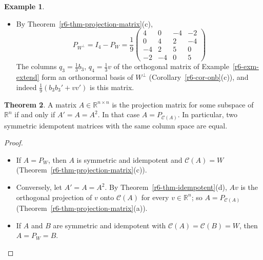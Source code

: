 \documentclass[12pt]{article}
\newcommand{\R}{\mathbb R}
\DeclareMathOperator{\tr}{tr}
\theoremstyle{definition}
\newtheorem{theorem}{Theorem}
\newtheorem{example}[theorem]{Example}
\begin{document}
\begin{example}
\begin{itemize}
\[\]
the same matrix, as Theorem~\ref{r6-thm-projection-matrix}(a),(b) asserts. Also
\(\tr P_W=\frac19(5+5+4+4)=2=\dim W\), and \(P_Wy=(0,5,-2,4)'=\hat w\) for \(y\) of
Example~\ref{r6-exm-projection-onb}.
\item By Theorem~\ref{r6-thm-projection-matrix}(c),
\[
P_{W^\perp}=I_4-P_W=\frac19\begin{pmatrix}4&0&-4&-2\\0&4&2&-4\\-4&2&5&0\\-2&-4&0&5\end{pmatrix}
\]
The columns \(q_3=\frac13b_3\), \(q_4=\frac13v\) of the orthogonal matrix of Example~\ref{r6-exm-extend} form an
orthonormal basis of \(W^\perp\) (Corollary~\ref{r6-cor-onb}(c)), and indeed
\(\frac19(b_3b_3'+vv')\) is this matrix.
\end{itemize}
\end{example}

\begin{theorem}\label{r6-thm-symmetric-idempotent}
A matrix \(A\in\R^{n\times n}\) is the projection matrix for some subspace of \(\R^n\) if and only if
\(A'=A=A^2\). In that case \(A=P_{\mathcal C(A)}\). In particular, two symmetric idempotent matrices with the same
column space are equal.
\end{theorem}
\begin{proof}
\begin{itemize}
\item If \(A=P_W\), then \(A\) is symmetric and idempotent and \(\mathcal C(A)=W\)
(Theorem~\ref{r6-thm-projection-matrix}(c)).
\item Conversely, let \(A'=A=A^2\). By Theorem~\ref{r6-thm-idempotent}(d), \(Av\) is the orthogonal projection of
\(v\) onto \(\mathcal C(A)\) for every \(v\in\R^n\); so \(A=P_{\mathcal C(A)}\)
(Theorem~\ref{r6-thm-projection-matrix}(a)).
\item If \(A\) and \(B\) are symmetric and idempotent with \(\mathcal C(A)=\mathcal C(B)=W\), then
\(A=P_W=B\).\qedhere
\end{itemize}
\end{proof}
\end{document}
